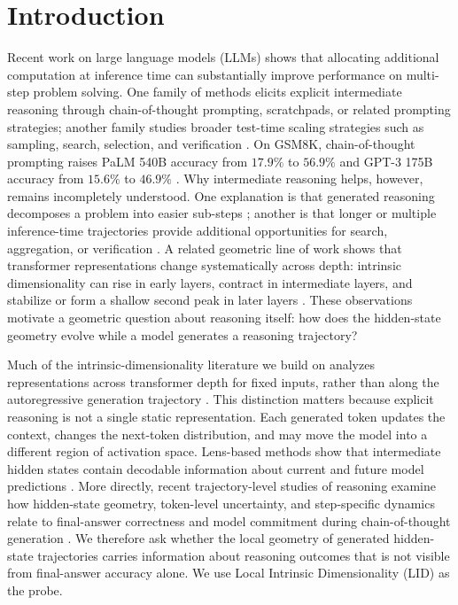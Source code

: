 \documentclass{article}
\theoremstyle{plain}
\theoremstyle{definition}
\theoremstyle{remark}
\begin{document}
\section{Introduction}

Recent work on large language models (LLMs) shows that allocating additional computation at inference time can substantially improve performance on multi-step problem solving. One family of methods elicits explicit intermediate reasoning through chain-of-thought prompting, scratchpads, or related prompting strategies; another family studies broader test-time scaling strategies such as sampling, search, selection, and verification \citep{wei2023chainofthoughtpromptingelicitsreasoning,nye2021show,wang2023selfconsistencyimproveschainthought,zhang2025surveytesttimescalinglarge,snell2024scaling}. On GSM8K, chain-of-thought prompting raises PaLM 540B accuracy from $17.9\%$ to $56.9\%$ and GPT-3 175B accuracy from $15.6\%$ to $46.9\%$ \citep{wei2023chainofthoughtpromptingelicitsreasoning}. {Why} intermediate reasoning helps, however, remains incompletely understood. One explanation is that generated reasoning decomposes a problem into easier sub-steps \citep{wei2023chainofthoughtpromptingelicitsreasoning}; another is that longer or multiple inference-time trajectories provide additional opportunities for search, aggregation, or verification \citep{wang2023selfconsistencyimproveschainthought,zhang2025surveytesttimescalinglarge}. A related geometric line of work shows that transformer representations change systematically across depth: intrinsic dimensionality can rise in early layers, contract in intermediate layers, and stabilize or form a shallow second peak in later layers \citep{valeriani2023geometryhiddenrepresentationslarge}. These observations motivate a geometric question about reasoning itself: how does the hidden-state geometry evolve while a model generates a reasoning trajectory?

Much of the intrinsic-dimensionality literature we build on analyzes representations {across transformer depth} for fixed inputs, rather than {along the autoregressive generation trajectory} \citep{valeriani2023geometryhiddenrepresentationslarge,van_Aken_2019}. This distinction matters because explicit reasoning is not a single static representation. Each generated token updates the context, changes the next-token distribution, and may move the model into a different region of activation space. Lens-based methods show that intermediate hidden states contain decodable information about current and future model predictions \citep{belrose2023eliciting,pal2023future}. More directly, recent trajectory-level studies of reasoning examine how hidden-state geometry, token-level uncertainty, and step-specific dynamics relate to final-answer correctness and model commitment during chain-of-thought generation \citep{sun2026llm,zur2025road}. We therefore ask whether the {local} geometry of generated hidden-state trajectories carries information about reasoning outcomes that is not visible from final-answer accuracy alone. We use Local Intrinsic Dimensionality (LID) \citep{NIPS2004_74934548} as the probe.
\end{document}
